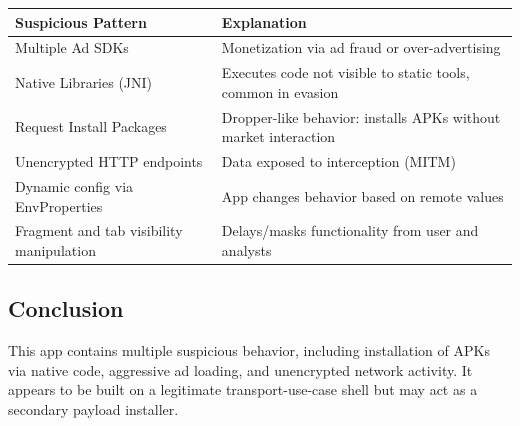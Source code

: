 \begin{longtable}{|p{}|p{}|}
\hline
\textbf{Suspicious Pattern} & \textbf{Explanation} \\
\hline
Multiple Ad SDKs & Monetization via ad fraud or over-advertising \\
\hline
Native Libraries (JNI) & Executes code not visible to static tools, common in evasion \\
\hline
Request Install Packages & Dropper-like behavior: installs APKs without market interaction \\
\hline
Unencrypted HTTP endpoints & Data exposed to interception (MITM) \\
\hline
Dynamic config via EnvProperties & App changes behavior based on remote values \\
\hline
Fragment and tab visibility manipulation & Delays/masks functionality from user and analysts \\
\hline
\end{longtable}

\subsection{Conclusion}

This app contains multiple suspicious behavior, including installation of APKs via native code, aggressive ad loading, and unencrypted network activity. It appears to be built on a legitimate transport-use-case shell but may act as a secondary payload installer.
